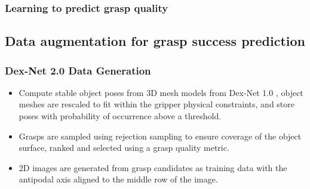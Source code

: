 \subsubsection{Learning to predict grasp quality}

\subsection{Data augmentation for grasp success prediction}

\subsubsection{Dex-Net 2.0 Data Generation} \label{dexnet-generation}
\begin{itemize}
    \item Compute stable object poses from 3D mesh models from Dex-Net 1.0 \cite{mahler2016}, object meshes are rescaled to fit within the gripper physical constraints, and store poses with probability of occurrence above a threshold.
    \item Grasps are sampled using rejection sampling to ensure coverage of the object surface, ranked and selected using a grasp quality metric.
    \item 2D images are generated from grasp candidates as training data with the antipodal axis aligned to the middle row of the image.
\end{itemize}

